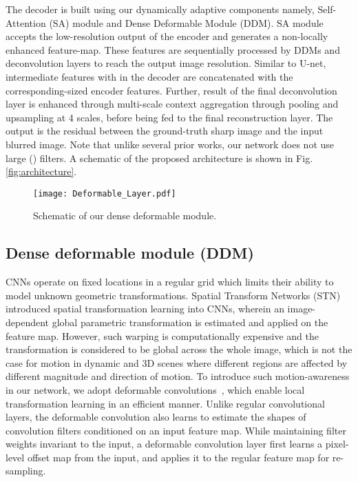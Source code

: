 \documentclass[letterpaper]{article} \usepackage{aaai20}  \usepackage{times}  \usepackage{helvet} \usepackage{courier}  \usepackage[hyphens]{url}  \usepackage{graphicx} \urlstyle{rm} \def\UrlFont{\rm}  \usepackage{graphicx}  \frenchspacing  \setlength{\pdfpagewidth}{8.5in}  \setlength{\pdfpageheight}{11in}
\begin{document}
The decoder is built using our dynamically adaptive components namely, Self-Attention (SA) module and Dense Deformable Module (DDM). SA module accepts the low-resolution output of the encoder and generates a non-locally enhanced feature-map. These features are sequentially processed by  DDMs and deconvolution layers to reach the output image resolution. Similar to U-net, intermediate features with in the decoder are concatenated with the corresponding-sized encoder features. Further, result of the final deconvolution layer is enhanced through multi-scale context aggregation through pooling and upsampling at 4 scales, before being fed to the final reconstruction layer. The output is the residual between the ground-truth sharp image and the input blurred image. Note that unlike several prior works, our network does not use large () filters. A schematic of the proposed architecture is shown in Fig. \ref{fig:architecture}. 



\begin{figure}[]
\centering
\texttt{[image: Deformable\_Layer.pdf]}
\caption{Schematic of our dense deformable module.}
\label{fig:deformableblock}
\end{figure}

\subsection{Dense deformable module (DDM)}
CNNs operate on fixed locations in a regular grid which limits their ability to model unknown geometric transformations. Spatial Transform Networks (STN) \cite{jaderberg2015spatial} introduced spatial transformation learning into CNNs, wherein an image-dependent global parametric transformation is estimated and applied on the feature map. However, such warping is computationally expensive and the transformation is considered to be global across the whole image, which is not the case for motion in dynamic and 3D scenes where different regions are affected by different magnitude and direction of motion. To introduce such motion-awareness in our network, we adopt deformable convolutions~\cite{dai2017deformable}, which enable local transformation learning in an efficient manner. Unlike regular convolutional layers, the deformable convolution also learns to estimate the shapes of convolution filters conditioned on an input feature map. While maintaining filter weights invariant to the input, a deformable convolution layer first learns a pixel-level offset map from the input, and applies it to the regular feature map for re-sampling.
\end{document}
